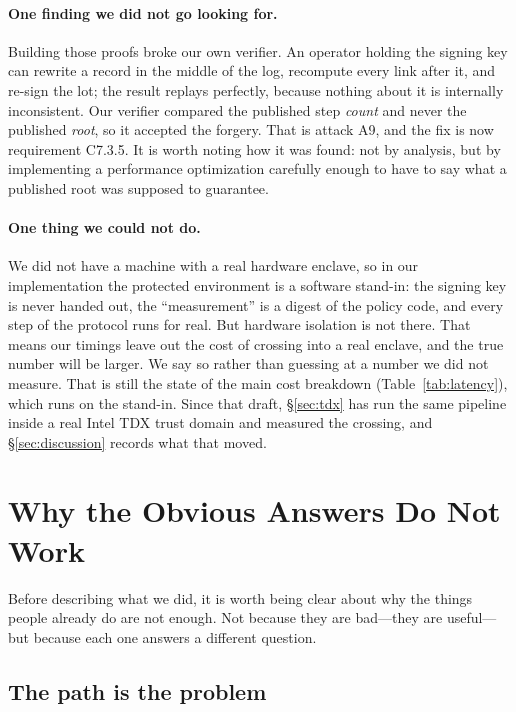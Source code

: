 \documentclass[11pt]{article}
\begin{document}
\paragraph{One finding we did not go looking for.} Building those proofs broke
our own verifier. An operator holding the signing key can rewrite a record in
the middle of the log, recompute every link after it, and re-sign the lot; the
result replays perfectly, because nothing about it is internally inconsistent.
Our verifier compared the published step \emph{count} and never the published
\emph{root}, so it accepted the forgery. That is attack A9, and the fix is now
requirement C7.3.5. It is worth noting how it was found: not by analysis,
but by implementing a performance optimization carefully enough to
have to say what a published root was supposed to guarantee.

\paragraph{One thing we could not do.} We did not have a machine with a real
hardware enclave, so in our implementation the protected environment is a
software stand-in: the signing key is never handed out, the ``measurement'' is
a digest of the policy code, and every step of the protocol runs for real. But
hardware isolation is not there. That means our timings leave out the cost of
crossing into a real enclave, and the true number will be larger. We say so
rather than guessing at a number we did not measure. That is still the state
of the main cost breakdown (Table~\ref{tab:latency}), which runs on the stand-in. Since that
draft, \S\ref{sec:tdx} has run the same pipeline inside a real Intel TDX
trust domain and measured the crossing, and \S\ref{sec:discussion} records
what that moved.

\section{Why the Obvious Answers Do Not Work}
\label{sec:background}

Before describing what we did, it is worth being clear about why the things
people already do are not enough. Not because they are bad---they are
useful---but because each one answers a different question.

\subsection{The path is the problem}
\label{sec:path}
\end{document}
